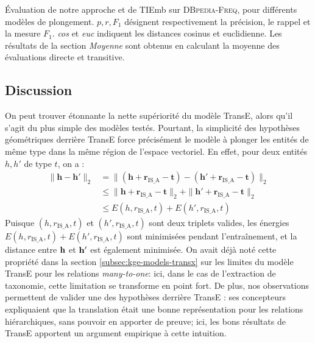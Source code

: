 \begin{table}
    \centering
    \caption[Évaluation de trois méthodes d'extraction de taxonomie]{
    Évaluation de notre approche et de TIEmb sur \textsc{DBpedia-Freq}, pour différents modèles de plongement. $p, r, F_1$ désignent respectivement la précision, le rappel et la mesure $F_1$. \textit{cos} et \textit{euc} indiquent les distances cosinus et euclidienne. Les résultats de la section \textit{Moyenne} sont obtenus en calculant la moyenne des évaluations directe et transitive.}
    \begin{adjustwidth}{-1in}{-1in}
        \begin{center}
            
            \label{tab:te-results} 
        \end{center}
    \end{adjustwidth}
\end{table}



\subsection{Discussion}
\label{subsec:te-discussion}


On peut trouver étonnante la nette supériorité du modèle TransE, alors qu'il s'agit du plus simple des modèles testés. Pourtant, la simplicité des hypothèses géométriques derrière TransE force précisément le modèle à plonger les entités de même type dans la même région de l'espace vectoriel. En effet, pour deux entités $h, h'$ de type $t$, on a :
\begin{align*}
    \| \mathbf{h} - \mathbf{h}'\|_2 &= \| (\mathbf{h} + \mathbf{r}_{\text{IS\_A}} - \mathbf{t}) - (\mathbf{h}' + \mathbf{r}_{\text{IS\_A}} - \mathbf{t}) \|_2 \\
        &\leq \| \mathbf{h} + \mathbf{r}_{\text{IS\_A}} - \mathbf{t} \|_2 +  \| \mathbf{h}' + \mathbf{r}_{\text{IS\_A}} - \mathbf{t} \|_2 \\
        &\leq E(h, r_{\text{IS\_A}}, t) + E(h', r_{\text{IS\_A}}, t)
\end{align*}
Puisque $(h, r_{\text{IS\_A}}, t)$ et $(h', r_{\text{IS\_A}}, t)$ sont deux triplets valides, les énergies $E(h, r_{\text{IS\_A}}, t) + E(h', r_{\text{IS\_A}}, t)$ sont minimisées pendant l'entraînement, et la distance entre $\bf{h}$ et $\bf{h'}$ est également minimisée. 
On avait déjà noté cette propriété dans la section \ref{subsec:kge-models-transx} sur les limites du modèle TransE pour les relations \textit{many-to-one}: ici, dans le cas de l'extraction de taxonomie, cette limitation se transforme en point fort. De plus, nos observations permettent de valider une des hypothèses derrière TransE : ses concepteurs expliquaient que la translation était une bonne représentation pour les relations hiérarchiques, sans pouvoir en apporter de preuve; ici, les bons résultats de TransE apportent un argument empirique à cette intuition.

